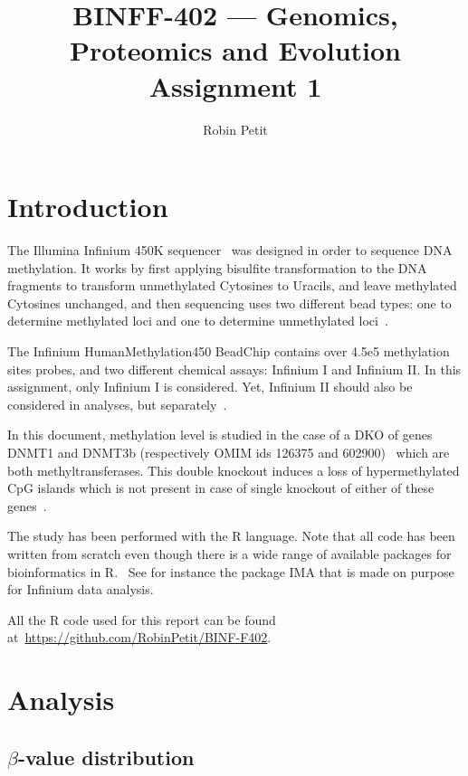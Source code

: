 \documentclass{article}
\title{BINFF-402 --- Genomics, Proteomics and Evolution \\ Assignment 1}
\author{Robin Petit}
\begin{document}
\maketitle

\section{Introduction}

The Illumina Infinium 450K sequencer~\cite{infinium450} was designed in order to sequence DNA methylation. It works by first applying
bisulfite transformation to the DNA fragments to transform unmethylated Cytosines to Uracils, and leave methylated Cytosines unchanged,
and then sequencing uses two different bead types: one to determine methylated loci and one to determine unmethylated
loci~\cite{weisenberger2008comprehensive}.

The Infinium HumanMethylation450 BeadChip contains over 4.5e5 methylation sites probes, and two different chemical assays: Infinium I and
Infinium II. In this assignment, only Infinium I is considered. Yet, Infinium II should also be considered in analyses, but
separately~\cite{dedeurwaerder2011evaluation}.

In this document, methylation level is studied in the case of a DKO of genes DNMT1 and DNMT3b (respectively OMIM ids 126375 and 602900)~\cite{amberger2008OMIM}
which are both methyltransferases. This double knockout induces a loss of hypermethylated CpG islands which is not present in case of
single knockout of either of these genes~\cite{paz2003genetic}.

The study has been performed with the R language. Note that all code has been written from scratch even though there is a wide range of
available packages for bioinformatics in R.~\cite{gentleman2004bioconductor} See for instance the package IMA that is made on purpose
for Infinium data analysis.~\cite{wang2012ima}

All the R code used for this report can be found at~\url{https://github.com/RobinPetit/BINF-F402}.

\section{Analysis}
\subsection{$\beta$-value distribution}
\end{document}
